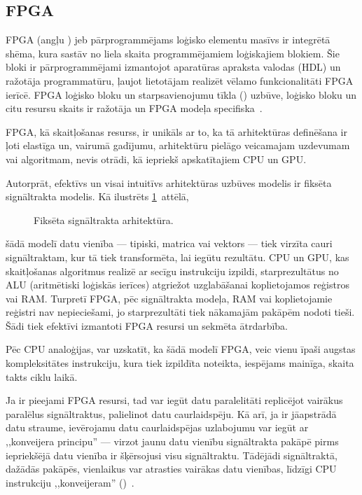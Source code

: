 \subsection{FPGA} \label{sec:fpga}
FPGA (angļu ) jeb
pārprogrammējams loģisko elementu masīvs ir integrētā shēma, kura sastāv no
liela skaita programmējamiem loģiskajiem blokiem. Šie bloki ir pārprogrammējami
izmantojot aparatūras apraksta valodas (HDL) un ražotāja programmatūru,
ļaujot lietotājam realizēt vēlamo funkcionalitāti FPGA ierīcē.
FPGA loģisko bloku un starpsavienojumu tīkla ()
uzbūve, loģisko bloku un citu resursu skaits ir ražotāja un
FPGA modeļa specifiska~\cite{JIS}.

FPGA, kā skaitļošanas resurss, ir unikāls ar to, ka tā arhitektūras definēšana
ir ļoti elastīga un, vairumā gadījumu, arhitektūru pielāgo veicamajam
uzdevumam vai algoritmam, nevis otrādi, kā iepriekš apskatītajiem CPU un GPU.

Autorprāt, efektīvs un visai intuitīvs arhitektūras uzbūves modelis ir
fiksēta signāltrakta modelis. Kā ilustrēts \ref{fig:fpga-arch}~attēlā,
\begin{figure}[tbh]
	\centering
	\def\svgscale{1.2}
	{}
	\caption{Fiksēta signāltrakta arhitektūra.}
	\label{fig:fpga-arch}
\end{figure}
šādā modelī datu vienība --- tipiski, matrica vai vektors --- tiek virzīta cauri
signāltraktam, kur tā tiek transformēta, lai iegūtu rezultātu. %
CPU un GPU, kas skaitļošanas algoritmus realizē ar secīgu instrukciju izpildi,
starprezultātus no ALU (aritmētiski loģiskās ierīces)
atgriežot uzglabāšanai koplietojamos reģistros vai RAM.
Turpretī FPGA, pēc signāltrakta modeļa, RAM vai koplietojamie reģistri nav
nepieciešami, jo starprezultāti tiek nākamajām pakāpēm nodoti tieši.
Šādi tiek efektīvi izmantoti FPGA resursi un sekmēta ātrdarbība.

Pēc CPU analoģijas, var uzskatīt, ka šādā modelī FPGA, veic vienu
īpaši augstas kompleksitātes instrukciju, kura tiek izpildīta noteikta,
iespējams mainīga, skaita takts ciklu laikā.

Ja ir pieejami FPGA resursi, tad var iegūt datu paralelitāti replicējot 
vairākus paralēlus signāltraktus, palielinot datu caurlaidspēju. Kā arī, ja ir
jāapstrādā datu straume, ievērojamu datu caurlaidspējas uzlabojumu var
iegūt ar ,,konveijera principu'' --- virzot jaunu datu vienību
signāltrakta pakāpē pirms iepriekšējā datu vienība ir šķērsojusi visu
signāltraktu. Tādējādi signāltraktā, dažādās pakāpēs, vienlaikus
var atrasties vairākas datu vienības, līdzīgi CPU instrukciju ,,konveijeram''
()~\cite{Flynn-arch}.

